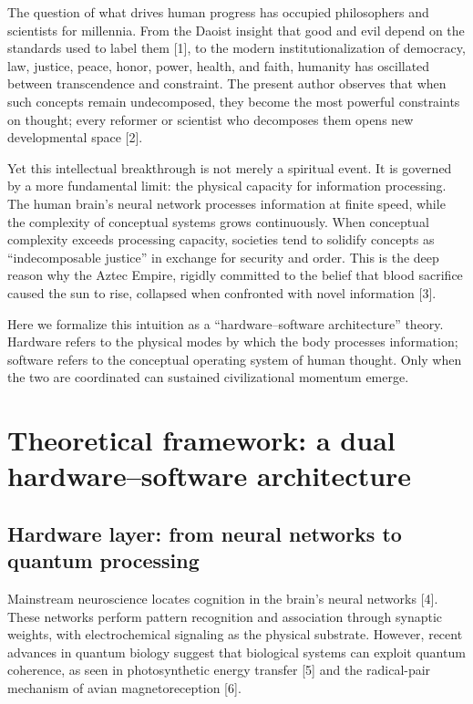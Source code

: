 \documentclass[11pt,a4paper]{article}
\begin{document}
The question of what drives human progress has occupied philosophers and scientists for millennia. From the Daoist insight that good and evil depend on the standards used to label them [1], to the modern institutionalization of democracy, law, justice, peace, honor, power, health, and faith, humanity has oscillated between transcendence and constraint. The present author observes that when such concepts remain undecomposed, they become the most powerful constraints on thought; every reformer or scientist who decomposes them opens new developmental space [2].

Yet this intellectual breakthrough is not merely a spiritual event. It is governed by a more fundamental limit: the physical capacity for information processing. The human brain's neural network processes information at finite speed, while the complexity of conceptual systems grows continuously. When conceptual complexity exceeds processing capacity, societies tend to solidify concepts as ``indecomposable justice'' in exchange for security and order. This is the deep reason why the Aztec Empire, rigidly committed to the belief that blood sacrifice caused the sun to rise, collapsed when confronted with novel information [3].

Here we formalize this intuition as a ``hardware--software architecture'' theory. Hardware refers to the physical modes by which the body processes information; software refers to the conceptual operating system of human thought. Only when the two are coordinated can sustained civilizational momentum emerge.

\section{Theoretical framework: a dual hardware--software architecture}

\subsection{Hardware layer: from neural networks to quantum processing}

Mainstream neuroscience locates cognition in the brain's neural networks [4]. These networks perform pattern recognition and association through synaptic weights, with electrochemical signaling as the physical substrate. However, recent advances in quantum biology suggest that biological systems can exploit quantum coherence, as seen in photosynthetic energy transfer [5] and the radical-pair mechanism of avian magnetoreception [6].
\end{document}
